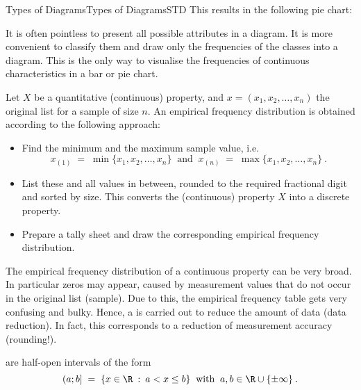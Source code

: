 \begin{MXContent}{Types of Diagrams}{Types of Diagrams}{STD}
This results in the following pie chart:

\begin{center}
\end{center}

It is often pointless to present all possible attributes in a diagram. It is more convenient to
classify them and draw only the frequencies of the classes into a diagram. This is the only way 
to visualise the frequencies of continuous characteristics in a bar or pie chart.

Let $X$ be a quantitative (continuous) property, and $x=(x_{1},x_{2},\ldots ,x_{n})$ the original list for a sample 
of size $n$. An empirical frequency distribution is obtained according to the following approach:
\begin{itemize}
\item{Find the minimum and the maximum sample value, i.e. 
$$
x_{(1)} \; =\; \min\lbrace x_{1},x_{2},\ldots ,x_{n}\rbrace\;\; \text{and}\;\;
x_{(n)} \; =\; \max\lbrace x_{1},x_{2},\ldots ,x_{n}\rbrace\: .
$$}
\item{List these and all values in between, rounded to the required fractional digit and sorted by size. This converts 
the (continuous) property $X$ into a discrete property.}
\item{Prepare a tally sheet and draw the corresponding empirical frequency distribution.}
\end{itemize}

The empirical frequency distribution of a continuous property can be very broad. In particular
zeros may appear, caused by measurement values that do not occur in the original list (sample). 
Due to this, the empirical frequency table gets very confusing and bulky. 
Hence, a  is carried out to reduce the amount of data (data reduction).
In fact, this corresponds to a reduction of measurement accuracy (rounding!).

\begin{MInfo}
 are half-open intervals of the form
$$
(a;b]\; =\; \lbrace x\in\R\:  : \: a<x\leq b\rbrace\;\; \text{with}\;\; a,b\in \R\cup\lbrace\pm \infty\rbrace\: .
$$
\end{MInfo}


\end{MXContent}
